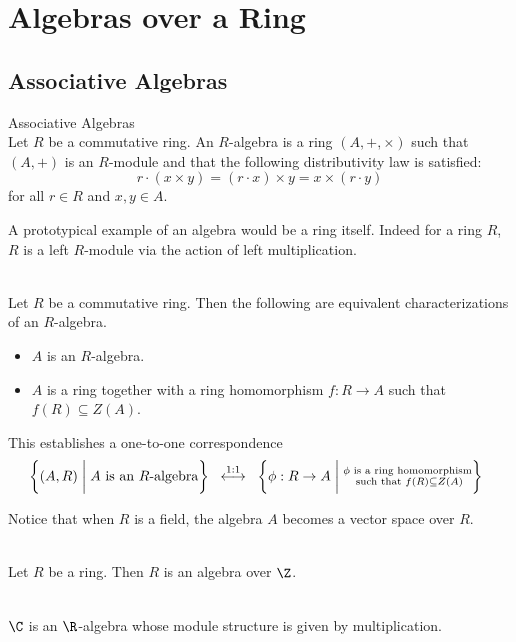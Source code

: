 \documentclass[a4paper]{article}
\begin{document}
\section{Algebras over a Ring}
\subsection{Associative Algebras}
\begin{defn}{Associative Algebras}{}\\
Let $R$ be a commutative ring. An $R$-algebra is a ring $(A,+,\times)$ such that $(A,+)$ is an $R$-module and that the following distributivity law is satisfied: $$r\cdot(x\times y)=(r\cdot x)\times y=x\times(r\cdot y)$$ for all $r\in R$ and $x,y\in A$. 
\end{defn}

A prototypical example of an algebra would be a ring itself. Indeed for a ring $R$, $R$ is a left $R$-module via the action of left multiplication. 

\begin{prp}{}{}\\
Let $R$ be a commutative ring. Then the following are equivalent characterizations of an $R$-algebra. 
\begin{itemize}
\item $A$ is an $R$-algebra. 
\item $A$ is a ring together with a ring homomorphism $f:R\to A$ such that $f(R)\subseteq Z(A)$. 
\end{itemize}
\end{prp}

This establishes a one-to-one correspondence $$\left\{(A,R)\;\bigg{|}\;A\text{ is an }R\text{-algebra}\right\}\;\;\overset{1:1}{\longleftrightarrow}\;\;\left\{\phi:R\to A\;\bigg{|}\;\substack{\phi\text{ is a ring homomorphism}\\\text{ such that }f(R)\subseteq Z(A)}\right\}\;\;$$

Notice that when $R$ is a field, the algebra $A$ becomes a vector space over $R$. 

\begin{eg}{}{}\\
Let $R$ be a ring. Then $R$ is an algebra over $\Z$. 
\end{eg}

\begin{eg}{}{}\\
$\C$ is an $\R$-algebra whose module structure is given by multiplication. 
\end{eg}
\end{document}
